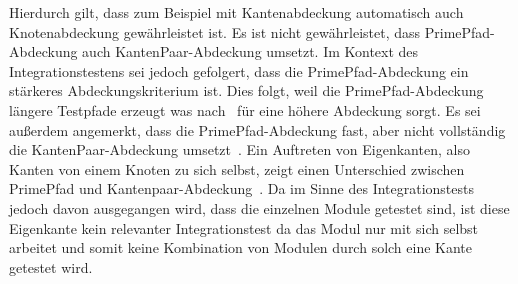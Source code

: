 Hierdurch gilt, dass zum Beispiel mit Kantenabdeckung automatisch auch Knotenabdeckung gewährleistet ist.
Es ist nicht gewährleistet, dass PrimePfad-Abdeckung auch KantenPaar-Abdeckung umsetzt.
Im Kontext des Integrationstestens sei jedoch gefolgert, dass die PrimePfad-Abdeckung ein stärkeres Abdeckungskriterium ist.
Dies folgt, weil die PrimePfad-Abdeckung längere Testpfade erzeugt was nach~\cite[vgl. RQ 1]{property-based-testing} für eine höhere Abdeckung sorgt.
Es sei außerdem angemerkt, dass die PrimePfad-Abdeckung fast, aber nicht vollständig die KantenPaar-Abdeckung umsetzt~\cite[vgl. S. 20]{introductiontosoftwaretestingpptx}.
Ein Auftreten von Eigenkanten, also Kanten von einem Knoten zu sich selbst, zeigt einen Unterschied zwischen PrimePfad und Kantenpaar-Abdeckung~\cite[vgl. S. 21]{introductiontosoftwaretestingpptx}.
Da im Sinne des Integrationstests jedoch davon ausgegangen wird, dass die einzelnen Module getestet sind, ist diese Eigenkante kein relevanter Integrationstest da
das Modul nur mit sich selbst arbeitet und somit keine Kombination von Modulen durch solch eine Kante getestet wird.